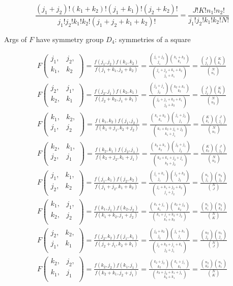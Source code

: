 \documentclass{article}
\begin{document}
\[
\frac{(j_1+j_2)!(k_1+k_2)!(j_1+k_1)!(j_2+k_2)!}{j_1!j_2!k_1!k_2!(j_1+j_2+k_1+k_2)!}
=\frac{J!K!n_1!n_2!}{j_1!j_2!k_1!k_2!N!}
\]

Args of $F$ have symmetry group $D_4$: symmetries of a square

\newpage

\newcommand{\myhypergeo}[4]{
  F\begin{pmatrix} #1, & #2, \\ #3, & #4 \\ \end{pmatrix}
  =\frac{f(#1, #2)f(#3, #4)}{f(#1+#3, #2+#4)}
  =\frac{{#1+#2 \choose #1}{#3+#4 \choose #3}}{{#1+#2+#3+#4 \choose #1+#3}}
}

\begin{align*}
  \myhypergeo{j_1}{j_2}{k_1}{k_2} = \frac{{J \choose j_1}{K \choose k_1}}{{N \choose n_1}} \\
  \myhypergeo{j_2}{j_1}{k_2}{k_1} = \frac{{J \choose j_2}{K \choose k_2}}{{N \choose n_2}} \\
  \myhypergeo{k_1}{k_2}{j_1}{j_2} = \frac{{K \choose k_1}{J \choose j_1}}{{N \choose n_1}} \\
  \myhypergeo{k_2}{k_1}{j_2}{j_1} = \frac{{K \choose k_2}{J \choose j_2}}{{N \choose n_2}} \\
  \myhypergeo{j_1}{k_1}{j_2}{k_2} = \frac{{n_1 \choose j_1}{n_2 \choose j_2}}{{N \choose J}} \\
  \myhypergeo{k_1}{j_1}{k_2}{j_2} = \frac{{n_1 \choose k_1}{n_2 \choose k_2}}{{N \choose K}} \\
  \myhypergeo{j_2}{k_2}{j_1}{k_1} = \frac{{n_2 \choose j_2}{n_1 \choose j_1}}{{N \choose J}} \\
  \myhypergeo{k_2}{j_2}{k_1}{j_1} = \frac{{n_2 \choose k_2}{n_1 \choose k_1}}{{N \choose K}}
\end{align*}
\end{document}
